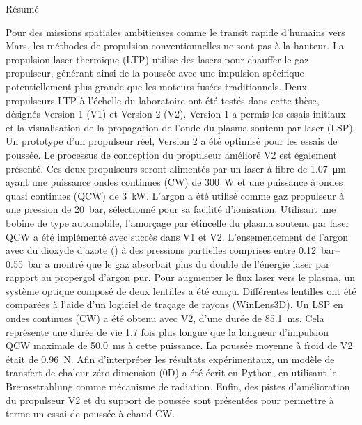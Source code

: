 
\begin{plainchp}{Résumé}

    Pour des missions spatiales ambitieuses comme le transit rapide d'humains vers Mars, les méthodes de propulsion conventionnelles ne sont pas à la hauteur. La propulsion laser-thermique (LTP) utilise des lasers pour chauffer le gaz propulseur, générant ainsi de la poussée avec une impulsion spécifique potentiellement plus grande que les moteurs fusées traditionnels. Deux propulseurs LTP à l'échelle du laboratoire ont été testés dans cette thèse, désignés Version 1 (V1) et Version 2 (V2). Version 1 a permis les essais initiaux et la visualisation de la propagation de l'onde du plasma soutenu par laser (LSP). Un prototype d'un propulseur réel, Version 2 a été optimisé pour les essais de poussée. Le processus de conception du propulseur amélioré V2 est également présenté. Ces deux propulseurs seront alimentés par un laser à fibre de \qty{1.07}{μm} ayant une puissance ondes continues (CW) de \qty{300}{W} et une puissance à ondes quasi continues (QCW) de \qty{3}{kW}. L'argon a été utilisé comme gaz propulseur à une pression de \qty{20}{bar}, sélectionné pour sa facilité d'ionisation. Utilisant une bobine de type automobile, l'amorçage par étincelle du plasma soutenu par laser QCW a été implémenté avec succès dans V1 et V2. L'ensemencement de l'argon avec du dioxyde d'azote () à des pressions partielles comprises entre \qtyrange{.12}{.55}{bar} a montré que le gaz absorbait plus du double de l'énergie laser par rapport au propergol d'argon pur. Pour augmenter le flux laser vers le plasma, un système optique composé de deux lentilles a été conçu. Différentes lentilles ont été comparées à l'aide d'un logiciel de traçage de rayons (WinLens3D). Un LSP en ondes continues (CW) a été obtenu avec V2, d'une durée de \qty{85.1}{ms}. Cela représente une durée de vie 1.7 fois plus longue que la longueur d'impulsion QCW maximale de \qty{50.0}{ms} à cette puissance. La poussée moyenne à froid de V2 était de \qty{0.96}{N}. Afin d'interpréter les résultats expérimentaux, un modèle de transfert de chaleur zéro dimension (0D) a été écrit en Python, en utilisant le Bremsstrahlung comme mécanisme de radiation. Enfin, des pistes d'amélioration du propulseur V2 et du support de poussée sont présentées pour permettre à terme un essai de poussée à chaud CW.
    
\end{plainchp}